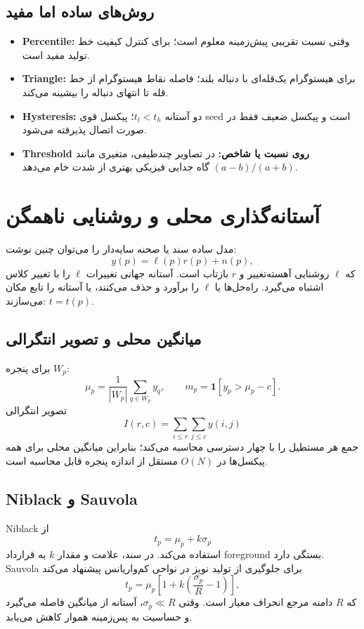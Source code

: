 \documentclass[12pt,openany,oneside]{book}
\newcommand{\ind}{\mathbf 1}
\begin{document}
\subsection{روش‌های ساده اما مفید}
\begin{itemize}
\item \textbf{Percentile:} وقتی نسبت تقریبی پیش‌زمینه معلوم است؛ برای کنترل کیفیت خط تولید مفید است.
\item \textbf{Triangle:} برای هیستوگرام یک‌قله‌ای با دنباله بلند؛ فاصله نقاط هیستوگرام از خط قله تا انتهای دنباله را بیشینه می‌کند.
\item \textbf{Hysteresis:} دو آستانه \(t_l<t_h\)؛ پیکسل قوی seed است و پیکسل ضعیف فقط در صورت اتصال پذیرفته می‌شود.
\item \textbf{Threshold روی نسبت یا شاخص:} در تصاویر چندطیفی، متغیری مانند \((a-b)/(a+b)\) گاه جدایی فیزیکی بهتری از شدت خام می‌دهد.
\end{itemize}

\section{آستانه‌گذاری محلی و روشنایی ناهمگن}
مدل ساده سند یا صحنه سایه‌دار را می‌توان چنین نوشت:
\[
y(p)=\ell(p)r(p)+n(p),
\]
که \(\ell\) روشنایی آهسته‌تغییر و \(r\) بازتاب است. آستانه جهانی تغییرات \(\ell\) را با تغییر کلاس اشتباه می‌گیرد.
راه‌حل‌ها یا \(\ell\) را برآورد و حذف می‌کنند، یا آستانه را تابع مکان می‌سازند: \(t=t(p)\).

\subsection{میانگین محلی و تصویر انتگرالی}
برای پنجره \(W_p\):
\[
\mu_p=\frac{1}{|W_p|}\sum_{q\in W_p}y_q,
\qquad
m_p=\ind[y_p>\mu_p-c].
\]
تصویر انتگرالی
\[
I(r,c)=\sum_{i\le r}\sum_{j\le c}y(i,j)
\]
جمع هر مستطیل را با چهار دسترسی محاسبه می‌کند؛ بنابراین میانگین محلی برای همه پیکسل‌ها در \(O(N)\) مستقل از
اندازه پنجره قابل محاسبه است.

\subsection{Niblack و Sauvola}
Niblack از
\[
t_p=\mu_p+k\sigma_p
\]
استفاده می‌کند. در سند، علامت و مقدار \(k\) به قرارداد foreground بستگی دارد. Sauvola برای جلوگیری از تولید نویز
در نواحی کم‌واریانس پیشنهاد می‌کند
\[
t_p=\mu_p\left[1+k\left(\frac{\sigma_p}{R}-1\right)\right],
\]
که \(R\) دامنه مرجع انحراف معیار است. وقتی \(\sigma_p\ll R\)، آستانه از میانگین فاصله می‌گیرد و حساسیت به
پس‌زمینه هموار کاهش می‌یابد.
\end{document}
